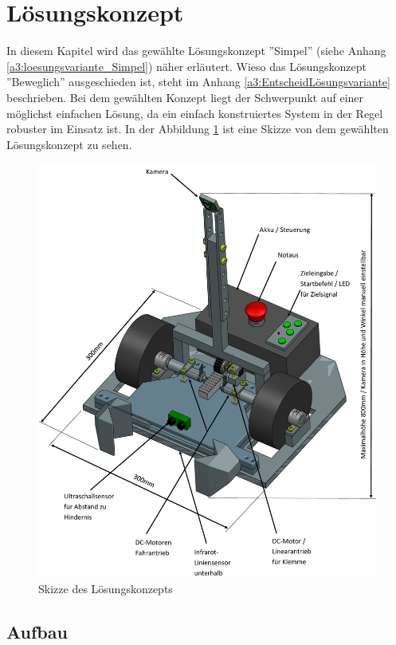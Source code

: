 \documentclass[../main.tex]{subfiles}
\begin{document}
\newpage
\section{Lösungskonzept}\label{lösungskonzept}

In diesem Kapitel wird das gewählte Lösungskonzept ''Simpel'' (siehe Anhang \ref{a3:loesungsvariante_Simpel}) näher erläutert. Wieso das Lösungskonzept ''Beweglich'' ausgeschieden ist, steht im Anhang \ref{a3:EntscheidLösungsvariante} beschrieben. Bei dem gewählten Konzept liegt der Schwerpunkt auf einer möglichst einfachen Lösung, da ein einfach konstruiertes System in der Regel robuster im Einsatz ist. In der Abbildung \ref{img:Konzept-Skizze_Fahrzeug} ist eine Skizze von dem gewählten Lösungskonzept zu sehen.

\begin{figure}[H]
\centering
\includegraphics[width=0.85\linewidth]{Skizze Konzept beschriftet.png}
\caption{Skizze des Lösungskonzepts}
\label{img:Konzept-Skizze_Fahrzeug}
\end{figure}

\subsection{Aufbau}
\end{document}
